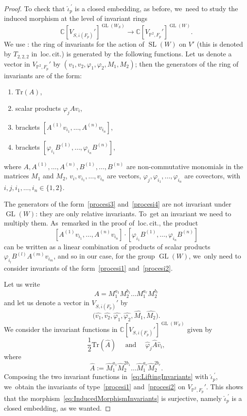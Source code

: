 \documentclass[11pt]{article}
\newenvironment{enumeratea}
{\bgroup\def\theenumi{\alph{enumi}}\begin{enumerate}}
{\end{enumerate}\egroup}
\newcommand{\CC}{{\mathbb C}}\let\C\CC
\newcommand{\PP}{{\mathbb P}}\let\P\PP
\DeclareMathOperator{\GL}{GL}
\DeclareMathOperator{\SL}{SL}
\let\phi\varphi
\theoremstyle{definition}
\begin{document}
\begin{proof}
To check that $\widehat{\iota}_p^{\ \prime}$ is a closed embedding, as before, we~need to study the induced morphism at the level of invariant rings
\begin{equation}\label{eq:InducedMorphismInvariants}
\CC[V_{S,\overline{\iota}(F_p)}']^{\GL(W_S)}\to \CC[V_{\PP^2,F_p}']^{\GL(W)}.
\end{equation}
We use \cite[Th.\,12.1]{procesi:invariants}: the ring of invariants for the action of $\SL(W)$ on $V'$ (this is denoted by $T_{2,2,2}$ in~loc.\,cit.) is generated by the following functions.
Let us denote a vector in $V_{\PP^2,F_p}'$ by $(v_1,v_2,\phi_1,\phi_2,M_1,M_2)$; then the generators of the ring of invariants are of the form:
\begin{enumeratea}
\item\label{procesi1} $\mathrm{Tr}(A)$,
\item\label{procesi2} scalar products $\phi_jAv_i$,
\item\label{procesi3} brackets $[A^{(1)}v_{i_1},\dots,A^{(n)} v_{i_n}]$,
\item\label{procesi4} brackets $[\phi_{i_1}B^{(1)},\dots,\phi_{i_n} B^{(n)}]$,
\end{enumeratea}
where $A,A^{(1)},\dots,A^{(n)},B^{(1)},\dots,B^{(n)}$ are non-commutative monomials in the matrices $M_1$ and $M_2$, $v_i,v_{i_1},\dots,v_{i_n}$ are vectors, $\phi_j,\phi_{i_1},\dots,\phi_{i_n}$ are covectors, with $i,j,i_1,\dots,i_n\in\{1,2\}$.

The generators of the form~\ref{procesi3} and~\ref{procesi4} are not invariant under $\GL(W)$: they are only relative invariants. To~get an invariant we need to multiply them. As~remarked in the proof of~loc.\,cit., the product
\[
[A^{(1)}v_{i_1},\dots,A^{(n)} v_{i_n}] \cdot [\phi_{i_1}B^{(1)},\dots,\phi_{i_n} B^{(n)}]
\]
can be written as a linear combination of products of scalar products $\phi_{i_l}B^{(l)}A^{(m)}v_{i_m}$, and so in our case, for the group $\GL(W)$, we~only need to consider invariants of the form~\ref{procesi1} and~\ref{procesi2}.

Let us write
\[
A=M_1^{a_1}M_2^{b_1}\dots M_1^{a_r}M_2^{b_r}
\]
and let us denote a vector in $V_{S,\overline{\iota}(F_p)}'$ by
\[
\bigl(\widehat{v_1},\widehat{v_2},\widehat{\phi_1},\widehat{\phi_2},\widehat{M_1},\widehat{M_2}\bigr).
\]
We consider the invariant functions in $\CC[V_{S,\overline{\iota}(F_p)}']^{\GL(W_S)}$ given by
\begin{equation}\label{eq:LiftingInvariants}
\frac 12 \mathrm{Tr} (\widehat{A})\quad \text{ and }\quad \widehat{\phi}_j \widehat{A} \widehat{v}_i,
\end{equation}
where
\[
\widehat{A} := \widehat{M}_1^{a_1}\widehat{M}_2^{2b_1}\dots \widehat{M}_1^{a_r}\widehat{M}_2^{2b_r}.
\]
Composing the two invariant functions in~\eqref{eq:LiftingInvariants} with $\widehat{\iota}_p^{\ \prime}$, we~obtain the invariants of type~\ref{procesi1} and~\ref{procesi2} on $V_{\PP^2,F_p}'$.
This shows that the morphism~\eqref{eq:InducedMorphismInvariants} is surjective, namely $\widehat{\iota}_p^{\ \prime}$ is a closed embedding, as we wanted.
\end{proof}
\end{document}
